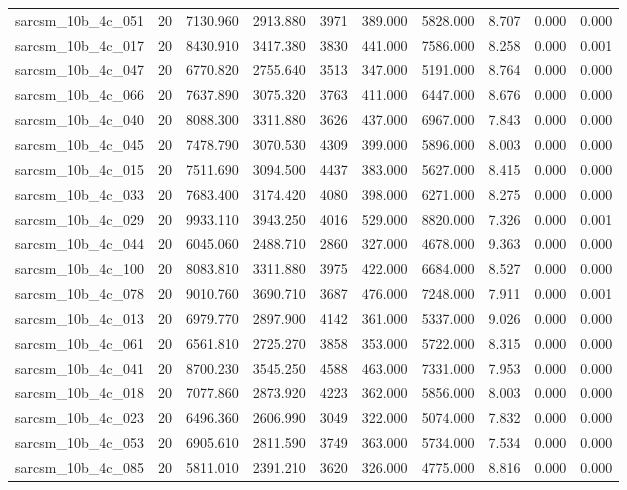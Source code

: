 \begin{tabular}{lrrrrrrrrr}
sarcsm\_10b\_4c\_051 & 20 & 7130.960 & 2913.880 & 3971 & 389.000 & 5828.000 & 8.707 & 0.000 & 0.000 \\
sarcsm\_10b\_4c\_017 & 20 & 8430.910 & 3417.380 & 3830 & 441.000 & 7586.000 & 8.258 & 0.000 & 0.001 \\
sarcsm\_10b\_4c\_047 & 20 & 6770.820 & 2755.640 & 3513 & 347.000 & 5191.000 & 8.764 & 0.000 & 0.000 \\
sarcsm\_10b\_4c\_066 & 20 & 7637.890 & 3075.320 & 3763 & 411.000 & 6447.000 & 8.676 & 0.000 & 0.000 \\
sarcsm\_10b\_4c\_040 & 20 & 8088.300 & 3311.880 & 3626 & 437.000 & 6967.000 & 7.843 & 0.000 & 0.000 \\
sarcsm\_10b\_4c\_045 & 20 & 7478.790 & 3070.530 & 4309 & 399.000 & 5896.000 & 8.003 & 0.000 & 0.000 \\
sarcsm\_10b\_4c\_015 & 20 & 7511.690 & 3094.500 & 4437 & 383.000 & 5627.000 & 8.415 & 0.000 & 0.000 \\
sarcsm\_10b\_4c\_033 & 20 & 7683.400 & 3174.420 & 4080 & 398.000 & 6271.000 & 8.275 & 0.000 & 0.000 \\
sarcsm\_10b\_4c\_029 & 20 & 9933.110 & 3943.250 & 4016 & 529.000 & 8820.000 & 7.326 & 0.000 & 0.001 \\
sarcsm\_10b\_4c\_044 & 20 & 6045.060 & 2488.710 & 2860 & 327.000 & 4678.000 & 9.363 & 0.000 & 0.000 \\
sarcsm\_10b\_4c\_100 & 20 & 8083.810 & 3311.880 & 3975 & 422.000 & 6684.000 & 8.527 & 0.000 & 0.000 \\
sarcsm\_10b\_4c\_078 & 20 & 9010.760 & 3690.710 & 3687 & 476.000 & 7248.000 & 7.911 & 0.000 & 0.001 \\
sarcsm\_10b\_4c\_013 & 20 & 6979.770 & 2897.900 & 4142 & 361.000 & 5337.000 & 9.026 & 0.000 & 0.000 \\
sarcsm\_10b\_4c\_061 & 20 & 6561.810 & 2725.270 & 3858 & 353.000 & 5722.000 & 8.315 & 0.000 & 0.000 \\
sarcsm\_10b\_4c\_041 & 20 & 8700.230 & 3545.250 & 4588 & 463.000 & 7331.000 & 7.953 & 0.000 & 0.000 \\
sarcsm\_10b\_4c\_018 & 20 & 7077.860 & 2873.920 & 4223 & 362.000 & 5856.000 & 8.003 & 0.000 & 0.000 \\
sarcsm\_10b\_4c\_023 & 20 & 6496.360 & 2606.990 & 3049 & 322.000 & 5074.000 & 7.832 & 0.000 & 0.000 \\
sarcsm\_10b\_4c\_053 & 20 & 6905.610 & 2811.590 & 3749 & 363.000 & 5734.000 & 7.534 & 0.000 & 0.000 \\
sarcsm\_10b\_4c\_085 & 20 & 5811.010 & 2391.210 & 3620 & 326.000 & 4775.000 & 8.816 & 0.000 & 0.000 \\

\end{tabular}
